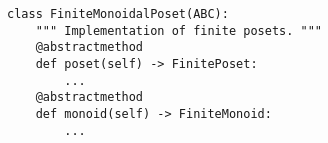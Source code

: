 \par\begin{minipage}{60ex}
\begin{verbatim}
class FiniteMonoidalPoset(ABC):
    """ Implementation of finite posets. """
    @abstractmethod
    def poset(self) -> FinitePoset:
        ...
    @abstractmethod
    def monoid(self) -> FiniteMonoid:
        ...
\end{verbatim}
\end{minipage}\par